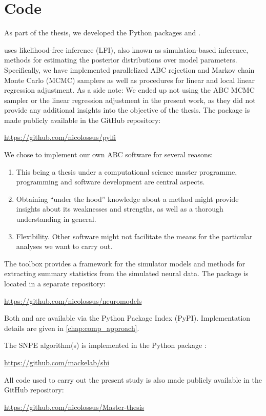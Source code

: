 \section{Code}

As part of the thesis, we developed the Python packages  and .

 uses likelihood-free inference (LFI), also known as simulation-based inference, methods for estimating the posterior distributions over model parameters. Specifically, we have implemented parallelized ABC rejection and Markov chain Monte Carlo (MCMC) samplers as well as procedures for linear and local linear regression adjustment. As a side note: We ended up not using the ABC MCMC sampler or the linear regression adjustment in the present work, as they did not provide any additional insights into the objective of the thesis. The package is made publicly available in the GitHub repository:

\begin{center}
    \url{https://github.com/nicolossus/pylfi}
\end{center}

We chose to implement our own ABC software for several reasons: 
\begin{enumerate}
    \item This being a thesis under a computational science master programme, programming and software development are central aspects. 
    \item Obtaining “under the hood” knowledge about a method might provide insights about its weaknesses and strengths, as well as a thorough understanding in general. 
    \item Flexibility. Other software might not facilitate the means for the particular analyses we want to carry out. 
\end{enumerate}

The  toolbox provides a framework for the simulator models and methods for extracting summary statistics from the simulated neural data. The package is located in a separate repository:

\begin{center}
    \url{https://github.com/nicolossus/neuromodels}
\end{center}

Both  and  are available via the Python Package Index (PyPI). Implementation details are given in \autoref{chap:comp_approach}.

The SNPE algorithm(s) is implemented in the  Python package \cite{sbi}: 

\begin{center}
    \url{https://github.com/mackelab/sbi}
\end{center}

All code used to carry out the present study is also made publicly available in the GitHub repository:

\begin{center}
    \url{https://github.com/nicolossus/Master-thesis}
\end{center}
